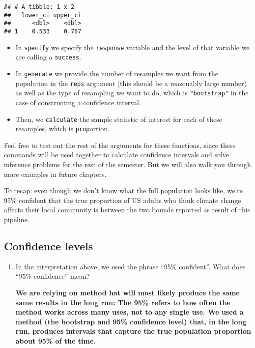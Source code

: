 \documentclass[
]{article}
\providecommand{\tightlist}{%
  \setlength{\itemsep}{0pt}\setlength{\parskip}{0pt}}
\begin{document}
\begin{verbatim}
## # A tibble: 1 x 2
##   lower_ci upper_ci
##      <dbl>    <dbl>
## 1    0.533    0.767
\end{verbatim}

\begin{itemize}
\tightlist
\item
  In \texttt{specify} we specify the \texttt{response} variable and the
  level of that variable we are calling a \texttt{success}.
\item
  In \texttt{generate} we provide the number of resamples we want from
  the population in the \texttt{reps} argument (this should be a
  reasonably large number) as well as the type of resampling we want to
  do, which is \texttt{"bootstrap"} in the case of constructing a
  confidence interval.
\item
  Then, we \texttt{calculate} the sample statistic of interest for each
  of these resamples, which is \texttt{prop}ortion.
\end{itemize}

Feel free to test out the rest of the arguments for these functions,
since these commands will be used together to calculate confidence
intervals and solve inference problems for the rest of the semester. But
we will also walk you through more examples in future chapters.

To recap: even though we don't know what the full population looks like,
we're 95\% confident that the true proportion of US adults who think
climate change affects their local community is between the two bounds
reported as result of this pipeline.

\subsection{Confidence levels}\label{confidence-levels}

\begin{enumerate}
\def\labelenumi{\arabic{enumi}.}
\item
  In the interpretation above, we used the phrase ``95\% confident''.
  What does ``95\% confidence'' mean?

  \textbf{We are relying on method hat will most likely produce the same
  same results in the long run: The 95\% refers to how often the method
  works across many uses, not to any single use. We used a method (the
  bootstrap and 95\% confidence level) that, in the long run, produces
  intervals that capture the true population proportion about 95\% of
  the time.}
\end{enumerate}
\end{document}
